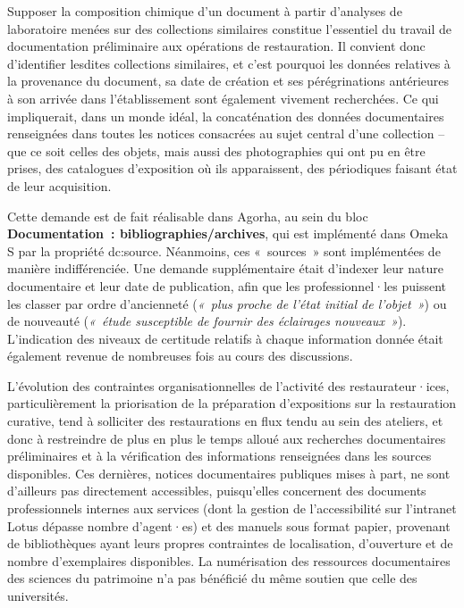 \documentclass[a4paper,12pt, twoside]{book}
\begin{document}
Supposer la composition chimique d’un document à partir d’analyses de laboratoire menées sur des collections similaires constitue l’essentiel du travail de documentation préliminaire aux opérations de restauration. Il convient donc d’identifier lesdites collections similaires, et c’est pourquoi les données relatives à la provenance du document, sa date de création et ses pérégrinations antérieures à son arrivée dans l’établissement sont également vivement recherchées. Ce qui impliquerait, dans un monde idéal, la concaténation des données documentaires renseignées dans toutes les notices consacrées au sujet central d’une collection – que ce soit celles des objets, mais aussi des photographies qui ont pu en être prises, des catalogues d’exposition où ils apparaissent, des périodiques faisant état de leur acquisition.

Cette demande est de fait réalisable dans Agorha, au sein du bloc \textbf{Documentation~: bibliographies/archives}, qui est implémenté dans Omeka S par la propriété \textsf{dc:source}. Néanmoins, ces «~sources~» sont implémentées de manière indifférenciée. Une demande supplémentaire était d’indexer leur nature documentaire et leur date de publication, afin que les professionnel·les puissent les classer par ordre d’ancienneté (\textit{«~plus proche de l’état initial de l’objet~»}) ou de nouveauté (\textit{«~étude susceptible de fournir des éclairages nouveaux~»}). L’indication des niveaux de certitude relatifs à chaque information donnée était également revenue de nombreuses fois au cours des discussions.

L’évolution des contraintes organisationnelles de l’activité des restaurateur·ices, particulièrement la priorisation de la préparation d’expositions sur la restauration curative, tend à solliciter des restaurations en flux tendu au sein des ateliers, et donc à restreindre de plus en plus le temps alloué aux recherches documentaires préliminaires et à la vérification des informations renseignées dans les sources disponibles. Ces dernières, notices documentaires publiques mises à part, ne sont d’ailleurs pas directement accessibles, puisqu’elles concernent des documents professionnels internes aux services (dont la gestion de l’accessibilité sur l’intranet Lotus dépasse nombre d’agent·es) et des manuels sous format papier, provenant de bibliothèques ayant leurs propres contraintes de localisation, d’ouverture et de nombre d’exemplaires disponibles. La numérisation des ressources documentaires des sciences du patrimoine n’a pas bénéficié du même soutien que celle des universités.
\end{document}
